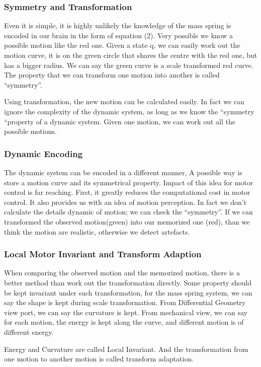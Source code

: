 \subsubsection*{Symmetry and Transformation}
Even it is simple, it is highly unlikely the knowledge of the mass spring is encoded in our brain in the form of equation (2).
Very possible we know a possible motion like the red one.
 Given a state q, we can easily work out the motion curve, it is on the green circle that shares the centre with the red one, but has a bigger radius.
 We can say the green curve is a scale transformed red curve.
 The property that we can transform one motion into another is called “symmetry”.

Using transformation, the new motion can be calculated easily.
 In fact we can ignore the complexity of the dynamic system, as long as we know the “symmetry “property of a dynamic system. Given one motion, we can work out all the possible motions.

\subsubsection*{Dynamic Encoding}

The dynamic system can be encoded in a different manner,
A possible way is store a motion curve and its symmetrical property.
Impact of this idea for motor control is far reaching. 
First, it greatly reduces the computational cost in motor control.
It also provides us with an idea of motion perception. 
In fact we don’t calculate the details dynamic of motion; we can check the “symmetry”. If we can transformed the observed motion(green) into our memorized one (red), than we think the motion are realistic, otherwise we detect artefacts.


\subsubsection*{Local Motor Invariant and Transform Adaption}
When comparing the observed motion and the memorized motion, there is a better method than work out the transformation directly. Some property should be kept invariant under such transformation, for the mass spring system, we can say the shape is kept during scale transformation. From Differential Geometry view port, we can say the curvature is kept. From mechanical view, we can say for each motion, the energy is kept along the curve, and different motion is of different energy. 

Energy and Curvature are called Local Invariant. And the transformation from one motion to another motion is called transform adaptation.



